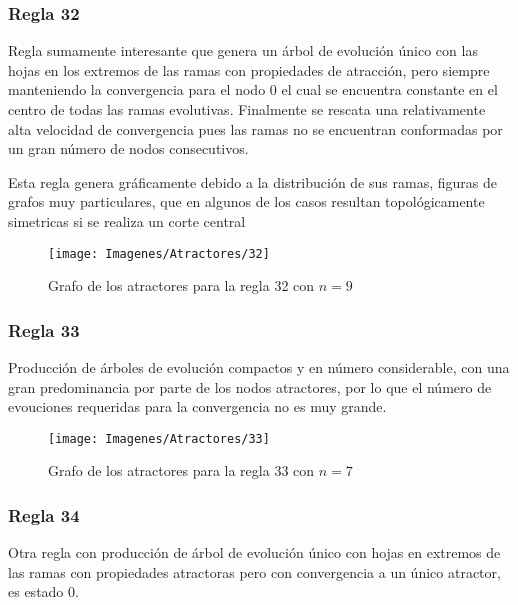 \documentclass[]{article}
\begin{document}
			
			\newpage
			\subsubsection{Regla 32}
				\justifying	
				Regla sumamente interesante que genera un árbol de evolución único con las hojas en los extremos de las ramas con propiedades de atracción, pero siempre manteniendo la convergencia para el nodo 0 el cual se encuentra constante en el centro de todas las ramas evolutivas. Finalmente se rescata una relativamente alta velocidad de convergencia pues las ramas no se encuentran conformadas por un gran número de nodos consecutivos.
				
				\hfill\break
				\break
				Esta regla genera gráficamente debido a la distribución de sus ramas, figuras de grafos muy particulares, que en algunos de los casos resultan topológicamente simetricas si se realiza un corte central
	
				\hfill\break
				\hfill\break
				\begin{figure}[!h]
					\centering
					\texttt{[image: Imagenes/Atractores/32]}
					\caption{Grafo de los atractores para la regla 32 con $n=9$}
					\label{Regla_32}
				\end{figure}
	
			
			\newpage
			\subsubsection{Regla 33}
				\justifying	
				Producción de árboles de evolución compactos y en número considerable, con una gran predominancia por parte de los nodos atractores, por lo que el número de evouciones requeridas para la convergencia no es muy grande.
				
				\hfill\break
				\hfill\break
				\begin{figure}[!h]
					\centering
					\texttt{[image: Imagenes/Atractores/33]}
					\caption{Grafo de los atractores para la regla 33 con $n=7$}
					\label{Regla_33}
				\end{figure}
				
			\newpage
			\subsubsection{Regla 34}
				\justifying
				Otra regla con producción de árbol de evolución único con hojas en extremos de las ramas con propiedades atractoras pero con convergencia a un único atractor, es estado 0.
				
\end{document}

